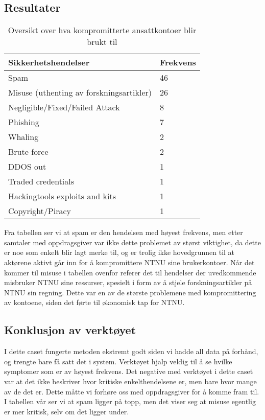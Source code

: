 \subsection{Resultater}
\begin{table} [H]
    \begin{tabular}{ | m{18em} | m{18em} | }
        \hline
            \cellcolor{yellow} Sikkerhetshendelser & \cellcolor{yellow} Frekvens \\
        \hline
            Spam & 46  \\
        \hline
            Misuse (uthenting av forskningsartikler) & 26 \\
        \hline
            Negligible/Fixed/Failed Attack  & 8 \\
        \hline
            Phishing & 7 \\
        \hline
            Whaling & 2 \\
        \hline
            Brute force & 2 \\
        \hline
            DDOS out & 1 \\
        \hline
            Traded credentials & 1 \\
        \hline
            Hackingtools exploits and kits & 1 \\
        \hline
            Copyright/Piracy & 1 \\
        \hline
    \end{tabular}
    \caption{Oversikt over hva kompromitterte ansattkontoer blir brukt til}
    \label{kritisk_tabell_2}
\end{table}

Fra tabellen ser vi at spam er den hendelsen med høyest frekvens, men etter samtaler med oppdragsgiver var ikke dette problemet av størst viktighet, da dette er noe som enkelt blir lagt merke til, og er trolig ikke hovedgrunnen til at aktørene aktivt går inn for å kompromittere NTNU sine brukerkontoer. Når det kommer til misuse i tabellen ovenfor referer det til hendelser der uvedkommende misbruker NTNU sine ressurser, spesielt i form av å stjele forskningsartikler på NTNU sin regning. Dette var en av de største problemene med kompromittering av kontoene, siden det førte til økonomisk tap for NTNU. 


\subsection{Konklusjon av verktøyet}
I dette caset fungerte metoden ekstremt godt siden vi hadde all data på forhånd, og trengte bare få satt det i system. Verktøyet hjalp veldig til å se hvilke symptomer som er av høyest frekvens. Det negative med verktøyet i dette caset var at det ikke beskriver hvor kritiske enkelthendelsene er, men bare hvor mange av de det er. Dette måtte vi forhøre oss med oppdragsgiver for å komme fram til. I tabellen vår ser vi at spam ligger på topp, men det viser seg at misuse egentlig er mer kritisk, selv om det ligger under. 




